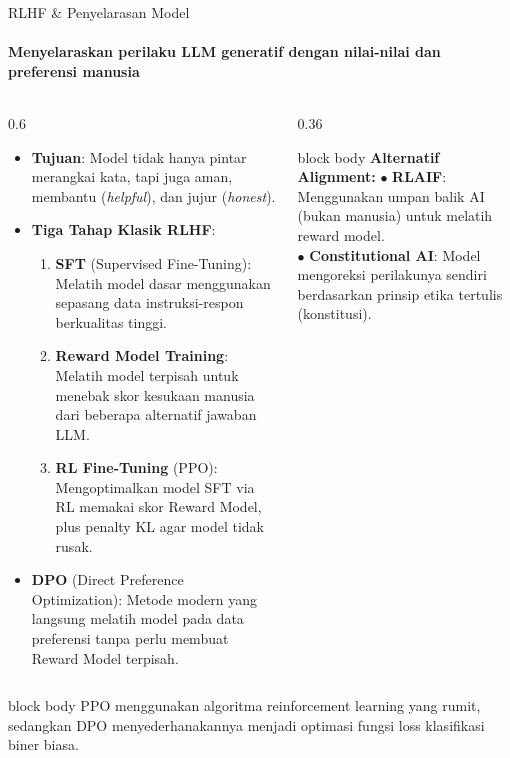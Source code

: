 \documentclass[aspectratio=169,t]{beamer}
\newcommand{\takeaway}[1]{%
  \vspace{0.1em}
  \begin{beamercolorbox}[rounded=true,shadow=false,sep=5pt]{block body}
    \centering\footnotesize\color{nvlightgreen}#1
  \end{beamercolorbox}%
}
\begin{document}
\begin{frame}{RLHF \& Penyelarasan Model}
  \framesubtitle{Menyelaraskan perilaku LLM generatif dengan nilai-nilai dan preferensi manusia}
  \begin{columns}[T]
    \begin{column}{0.6\textwidth}
      \begin{itemize}\scriptsize
        \item \textbf{Tujuan}: Model tidak hanya pintar merangkai kata, tapi juga aman, membantu (\emph{helpful}), dan jujur (\emph{honest}).
        \item \textbf{Tiga Tahap Klasik RLHF}:
          \begin{enumerate}\scriptsize
            \item \textbf{SFT} (Supervised Fine-Tuning): Melatih model dasar menggunakan sepasang data instruksi-respon berkualitas tinggi.
            \item \textbf{Reward Model Training}: Melatih model terpisah untuk menebak skor kesukaan manusia dari beberapa alternatif jawaban LLM.
            \item \textbf{RL Fine-Tuning} (PPO): Mengoptimalkan model SFT via RL memakai skor Reward Model, plus penalty KL agar model tidak rusak.
          \end{enumerate}
        \item \textbf{DPO} (Direct Preference Optimization): Metode modern yang langsung melatih model pada data preferensi tanpa perlu membuat Reward Model terpisah.
      \end{itemize}
    \end{column}
    \begin{column}{0.36\textwidth}
      \begin{center}
      \begin{beamercolorbox}[rounded=true,shadow=false,sep=8pt]{block body}
        {\footnotesize\color{nvlightgreen}\textbf{Alternatif Alignment:}}
        \vspace{0.3em}
        {\scriptsize\color{nvwhite}
        $\bullet$ \textbf{RLAIF}: Menggunakan umpan balik AI (bukan manusia) untuk melatih reward model.\\
        $\bullet$ \textbf{Constitutional AI}: Model mengoreksi perilakunya sendiri berdasarkan prinsip etika tertulis (konstitusi).}
      \end{beamercolorbox}
      \end{center}
    \end{column}
  \end{columns}
  \takeaway{PPO menggunakan algoritma reinforcement learning yang rumit, sedangkan DPO menyederhanakannya menjadi optimasi fungsi loss klasifikasi biner biasa.}
\end{frame}
\end{document}
